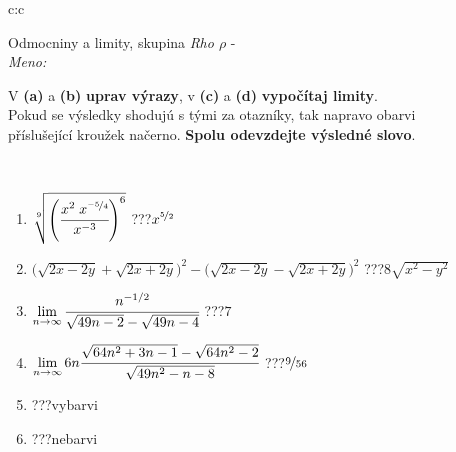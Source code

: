 \documentclass[10pt]{report}
\begin{document}
\newpage
\thispagestyle{empty}
\begin{tabular}{c:c}
\begin{minipage}[c][104.5mm][t]{0.5\linewidth}
\begin{center}
\vspace{7mm}
{\huge Odmocniny a limity, skupina \textit{Rho $\rho$} -}\\[5mm]
\textit{Meno:}\phantom{xxxxxxxxxxxxxxxxxxxxxxxxxxxxxxxxxxxxxxxxxxxxxxxxxxxxxxxxxxxxxxxxx}\\[5mm]
\begin{minipage}{0.95\linewidth}
\begin{center}
V \textbf{(a)} a \textbf{(b)} \textbf{uprav výrazy}, v \textbf{(c)} a \textbf{(d)} \textbf{vypočítaj limity}.\\Pokud se výsledky shodujú s tými za otazníky, tak napravo obarvi\\příslušející kroužek načerno. \textbf{Spolu odevzdejte výsledné slovo}.
\end{center}
\end{minipage}
\\[1mm]
\begin{minipage}{0.79\linewidth}
\begin{center}
\begin{varwidth}{\linewidth}
\begin{enumerate}
\small
\item $\sqrt[9]{\left(\cfrac{x^{2}\;x^{\nicefrac{-5}{4}}}{x^{-3}}\right)^{6}}$\quad \dotfill\; ???\;\dotfill \quad $x^{\nicefrac{5}{2}}$
\item {\footnotesize{\scriptsize$\big(\sqrt{2x-2y}+\sqrt{2x+2y}\big)^2-\big(\sqrt{2x-2y}-\sqrt{2x+2y}\big)^2$}\quad \dotfill\; ???\;\dotfill \quad $8\sqrt{x^2-y^2}$}
\item $\lim\limits_{n\to\infty}\cfrac{n^{-1/2}}{\sqrt{49n-2}-\sqrt{49n-4}}$\quad \dotfill\; ???\;\dotfill \quad $7$
\item $\lim\limits_{n\to\infty}6n\cfrac{\sqrt{64n^2+3n-1}-\sqrt{64n^2-2}}{\sqrt{49n^2-n-8}}$\quad \dotfill\; ???\;\dotfill \quad $\nicefrac{9}{56}$
\item \quad \dotfill\; ???\;\dotfill \quad vybarvi
\item \quad \dotfill\; ???\;\dotfill \quad nebarvi
\end{enumerate}
\end{varwidth}
\end{center}
\end{minipage}
\begin{minipage}{0.20\linewidth}

\end{minipage}
\end{center}
\end{minipage}
\end{tabular}
\end{document}
